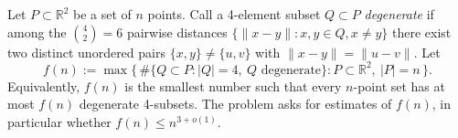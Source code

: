 Let \(P\subset\mathbb{R}^2\) be a set of \(n\) points.
Call a 4-element subset \(Q\subset P\) \emph{degenerate} if among the \(\binom{4}{2}=6\) pairwise distances \(\{\|x-y\|: x,y\in Q, x\ne y\}\) there exist two distinct unordered pairs \(\{x,y\}\ne\{u,v\}\) with \(\|x-y\|=\|u-v\|\).
Let
\[
 f(n):=\max\{\,\#\{Q\subset P: |Q|=4,\ Q\text{ degenerate}\}: P\subset\mathbb{R}^2,\ |P|=n\,\}.
\]
Equivalently, \(f(n)\) is the smallest number such that every \(n\)-point set has at most \(f(n)\) degenerate 4-subsets.
The problem asks for estimates of \(f(n)\), in particular whether \(f(n)\le n^{3+o(1)}\).

